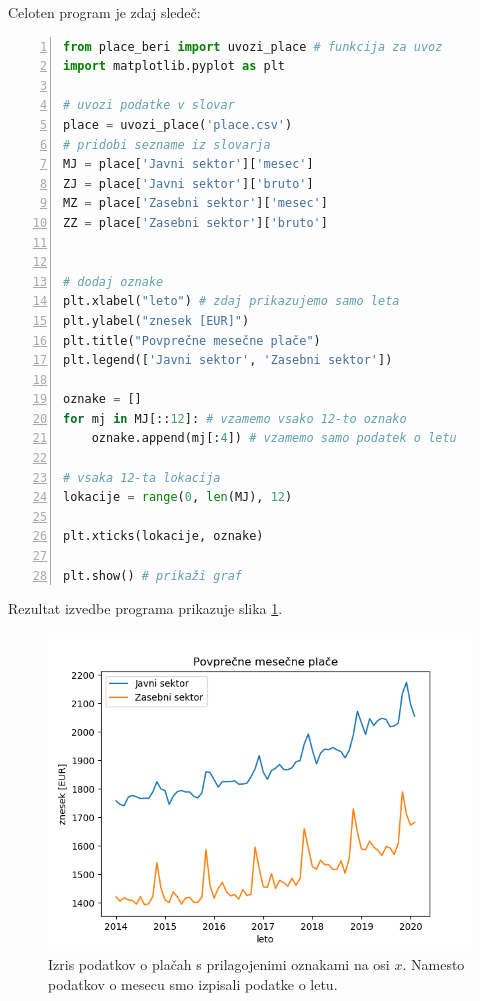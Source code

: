 Celoten program je zdaj sledeč:
\begin{lstlisting}[language=Python, showstringspaces=false,numbers=left]
from place_beri import uvozi_place # funkcija za uvoz
import matplotlib.pyplot as plt

# uvozi podatke v slovar
place = uvozi_place('place.csv')
# pridobi sezname iz slovarja
MJ = place['Javni sektor']['mesec']
ZJ = place['Javni sektor']['bruto']
MZ = place['Zasebni sektor']['mesec']
ZZ = place['Zasebni sektor']['bruto']


# dodaj oznake
plt.xlabel("leto") # zdaj prikazujemo samo leta
plt.ylabel("znesek [EUR]")
plt.title("Povprečne mesečne plače")
plt.legend(['Javni sektor', 'Zasebni sektor'])

oznake = []
for mj in MJ[::12]: # vzamemo vsako 12-to oznako
    oznake.append(mj[:4]) # vzamemo samo podatek o letu

# vsaka 12-ta lokacija
lokacije = range(0, len(MJ), 12) 

plt.xticks(lokacije, oznake)

plt.show() # prikaži graf
\end{lstlisting}
Rezultat izvedbe programa prikazuje slika \ref{img:plt5}.
\begin{figure}
    \includegraphics[width=\linewidth]{img/plt5.png}
    \caption{Izris podatkov o plačah s prilagojenimi oznakami na osi $x$. Namesto podatkov o mesecu smo izpisali podatke o letu.}
    \label{img:plt5}
\end{figure}

